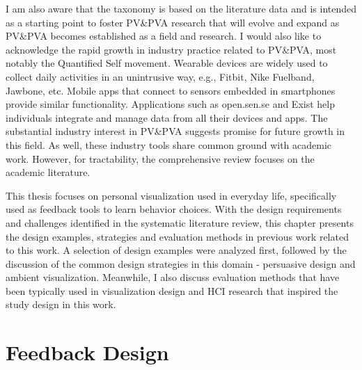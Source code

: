 \documentclass[12pt,oneside]{book}
\begin{document}
I am also aware that the taxonomy is based on the literature data and is intended as a starting point to foster PV\&PVA research that will evolve and expand as PV\&PVA becomes established as a field and research.  I would also like to acknowledge the rapid growth in industry practice related to PV\&PVA, most notably the Quantified Self movement.  Wearable devices are widely used to collect daily activities in an unintrusive way, e.g., Fitbit, Nike Fuelband, Jawbone, etc. Mobile apps that connect to sensors embedded in smartphones provide similar functionality.  Applications such as open.sen.se and Exist help individuals integrate and manage data from all their devices and apps.  The substantial industry interest in PV\&PVA suggests promise for future growth in this field. As well, these industry tools share common ground with academic work.  However, for tractability, the comprehensive review focuses on the academic literature.



\label{chap:relatedWork}

This thesis focuses on personal visualization used in everyday life, specifically used as feedback tools to learn behavior choices. With the design requirements and challenges identified in the systematic literature review, this chapter presents the design examples, strategies and evaluation methods in previous work related to this work.  A selection of design examples were analyzed first, followed by the discussion of the common design strategies in this domain - persuasive design and ambient visualization. Meanwhile, I also discuss evaluation methods that have been typically used in visualization design and HCI research that inspired the study design in this work.

\section{Feedback Design}
\label{section:relatedWork:feedback design}
\end{document}
